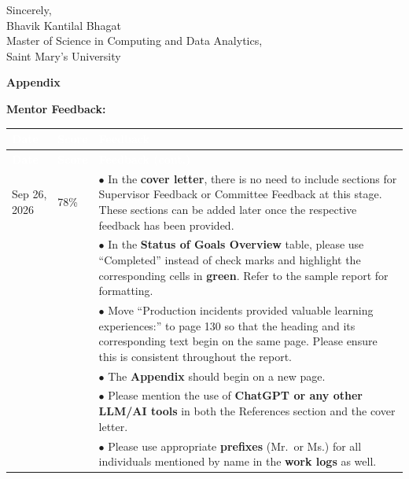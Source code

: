 \documentclass[12pt,oneside,letterpaper]{article}
\begin{document}
Sincerely,\\
Bhavik Kantilal Bhagat\\
Master of Science in Computing and Data Analytics,\\
Saint Mary's University

\newpage
\begin{center}
{\fontsize{20}{24}\selectfont\textbf{\textcolor{smubrand}{Appendix}}}
\end{center}

\vspace{0.5cm}

\textbf{\textcolor{smubrand}{Mentor Feedback:}}

\vspace{0.3cm}

{
\begin{longtable}{@{\hspace{\tabcolsep}}p{}p{}p{}@{\hspace{\tabcolsep}}}
\hline
\rowcolor{smubrand}\textcolor{white}{\textbf{Date}} & \textcolor{white}{\textbf{Score}} & \textcolor{white}{\textbf{Feedback}} \\
\hline
\endfirsthead
\hline
\rowcolor{smubrand}\textcolor{white}{\textbf{Date}} & \textcolor{white}{\textbf{Score}} & \textcolor{white}{\textbf{Feedback (cont.)}} \\
\hline
\endhead
\hline
\endfoot
Sep 26, 2026 & 78\% & $\bullet$ In the \textbf{cover letter}, there is no need to include sections for Supervisor Feedback or Committee Feedback at this stage. These sections can be added later once the respective feedback has been provided. \\
 & & $\bullet$ In the \textbf{Status of Goals Overview} table, please use ``Completed'' instead of check marks and highlight the corresponding cells in \textbf{green}. Refer to the sample report for formatting. \\
 & & $\bullet$ Move ``Production incidents provided valuable learning experiences:'' to page 130 so that the heading and its corresponding text begin on the same page. Please ensure this is consistent throughout the report. \\
 & & $\bullet$ The \textbf{Appendix} should begin on a new page. \\
 & & $\bullet$ Please mention the use of \textbf{ChatGPT or any other LLM/AI tools} in both the References section and the cover letter. \\
 & & $\bullet$ Please use appropriate \textbf{prefixes} (Mr.\ or Ms.) for all individuals mentioned by name in the \textbf{work logs} as well. \\

\end{longtable}}
\end{document}
